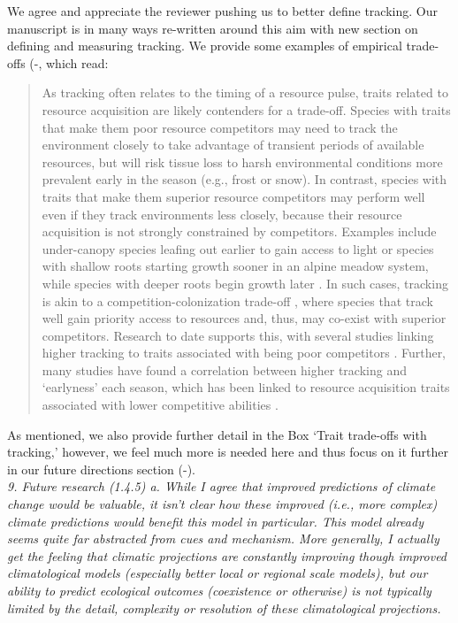 \documentclass[11pt]{article}
\begin{document}
We agree and appreciate the reviewer pushing us to better define tracking. Our manuscript is in many ways re-written around this aim with new section on defining and measuring tracking. We provide some examples of empirical trade-offs (-, which read:
\begin{quote}
As tracking often relates to the timing of a resource pulse, traits related to resource acquisition are likely contenders for a trade-off. Species with traits that make them poor resource competitors may need to track the environment closely to take advantage of transient periods of available resources, but will risk tissue loss to harsh environmental conditions more prevalent early in the season (e.g., frost or snow). In contrast, species with traits that make them superior resource competitors may perform well even if they track environments less closely, because their resource acquisition is not strongly constrained by competitors. Examples include under-canopy species leafing out earlier to gain access to light \citep{heberling2019} or species with shallow roots starting growth sooner in an alpine meadow system, while species with deeper roots begin growth later \citep{Zhu2016BioLetters}. In such cases, tracking is akin to a competition-colonization trade-off \citep{Amarasekare:2003tq}, where species that track well gain priority access to resources and, thus, may co-exist with superior competitors. Research to date supports this, with several studies linking higher tracking to traits associated with being poor competitors \citep{Dorji2013,lasky2016,Zhu2016BioLetters}. Further, many studies have found a correlation between higher tracking and `earlyness' each season, which has been linked to resource acquisition traits associated with lower competitive abilities \citep[][see Box `Trait trade-offs with tracking']{wolkovich2014aob}. 
\end{quote}
As mentioned, we also provide further detail in the Box `Trait trade-offs with tracking,' however, we feel much more is needed here and thus focus on it further in our future directions section (-). \\

\emph{9.      Future research (1.4.5)
a.      While I agree that improved predictions of climate change would be valuable, it isn't
clear how these improved (i.e., more complex) climate predictions would benefit this model in
particular. This model already seems quite far abstracted from cues and mechanism. More
generally, I actually get the feeling that climatic projections are constantly improving
though improved climatological models (especially better local or regional scale models), but
our ability to predict ecological outcomes (coexistence or otherwise) is not typically
limited by the detail, complexity or resolution of these climatological projections.}\\
\end{document}
